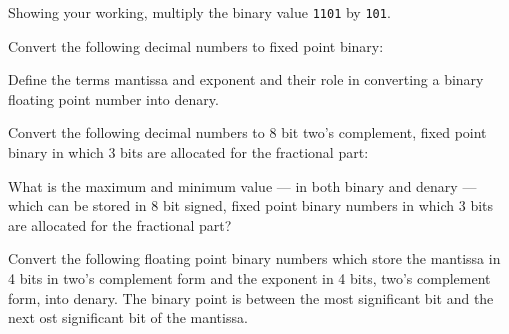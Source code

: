 \begin{questions}
	\question Showing your working, multiply the binary value \texttt{1101} by \texttt{101}. 


	\question Convert the following decimal numbers to fixed point binary: 

	\question Define the terms mantissa and exponent and their role in converting a binary floating point number into denary. 

	\question Convert the following decimal numbers to 8 bit two's complement, fixed point binary in which 3 bits are allocated for the fractional part: 

	\question What is the maximum and minimum value --- in both binary and denary --- which can be stored in 8 bit signed, fixed point binary numbers in which 3 bits are allocated for the fractional part? 

	\question Convert the following floating point binary numbers which store the mantissa in 4 bits in two's complement form and the exponent in 4 bits, two's complement form, into denary. The binary point is between the most significant bit and the next ost significant bit of the mantissa. 
\end{questions}
